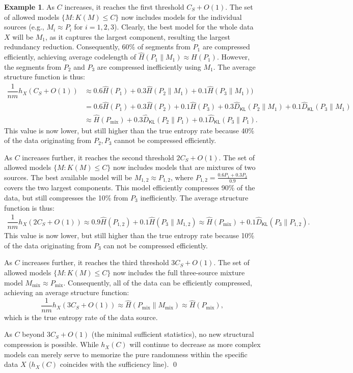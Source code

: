 \documentclass[11pt]{article}
\theoremstyle{plain}
\theoremstyle{definition}
\newtheorem{example}[theorem]{Example}
\newcommand{\entropyrate}{\hat{H}}
\newcommand{\KLrate}{\hat{D}_{\mathsf{KL}}}
\begin{document}
\begin{example}
As \(C\) increases, it reaches the first threshold $C_S + O(1)$. The set of allowed models $\{M: K(M) \le C\}$ now includes models for the individual sources (e.g., $M_i \approx P_i$ for $i=1,2,3$). Clearly, the best model for the whole data $X$ will be $M_1$, as it captures the largest component, resulting the largest redundancy reduction. Consequently, 60\% of segments from $P_1$ are compressed efficiently, achieving average codelength of $\entropyrate(P_1\|M_1)\approx H(P_1)$. However, the segments from $P_2$ and $P_3$ are compressed inefficiently using $M_1$. The average structure function is thus:
\begin{align*}
\dfrac{1}{nm}h_X(C_S+O(1)) & \approx 0.6 \entropyrate(P_1) + 0.3 \entropyrate(P_2\| M_1) + 0.1 \entropyrate(P_3\| M_1)) \\ & = 0.6 \entropyrate(P_1) + 0.3\entropyrate(P_2)+ 0.1\entropyrate(P_3) + 0.3 \KLrate(P_2\| M_1) + 0.1\KLrate(P_3\|M_1)
\\ & \approx \entropyrate(P_{\text{mix}})+0.3 \KLrate(P_2\| P_1) + 0.1\KLrate(P_3\|P_1).   
\end{align*}
This value is now lower, but still higher than the true entropy rate because 40\% of the data originating from $P_2, P_3$ cannot be compressed efficiently.

As \(C\) increases further, it reaches the second threshold \(2C_S + O(1)\). The set of allowed models $\{M: K(M) \le C\}$ now includes models that are mixtures of two sources. The best available model will be $M_{1,2}\approx P_{1,2}$, where $P_{1,2}=\frac{0.6P_1+0.3P_2}{0.9}$ covers the two largest components. This model efficiently compresses 90\% of the data, but still compresses the 10\% from $P_3$ inefficiently. The average structure function is thus: 
\begin{align*}
    \dfrac{1}{nm}h_X(2C_S+O(1))  \approx 0.9\entropyrate(P_{1,2})+0.1\entropyrate(P_3\|M_{1,2})
     \approx \entropyrate(P_{\text{mix}})+ 0.1\KLrate(P_3\|P_{1,2}).
\end{align*}
This value is now lower, but still higher than the true entropy rate because 10\% of the data originating from $P_3$ can not be compressed efficiently.

As \(C\) increases further, it reaches the third threshold \(3C_S + O(1)\). The set of allowed models $\{M: K(M) \le C\}$ now includes the full three-source mixture model $M_{\text{mix}}\approx P_{\text{mix}}$. Consequently, all of the data can be efficiently compressed, achieving an average structure function: 
$$
\dfrac{1}{nm}h_X(3C_S+O(1))\approx\entropyrate(P_{\text{mix}}\|M_{\text{mix}}) \approx \entropyrate(P_{\text{mix}}),
$$ 
which is the true entropy rate of the data source.

As \(C\) beyond \(3C_S+O(1)\) (the minimal sufficient statistics), no new structural compression is possible. While $h_X(C)$ will continue to decrease as more complex models can merely serve to memorize the pure
randomness within the specific data $X$
($h_X(C)$ coincides with the sufficiency line).
\qed
\end{example}
\end{document}
